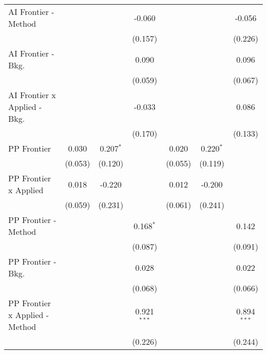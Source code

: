 \begin{tabular}{lcccccc}
   AI Frontier - Method           &         &               & -0.060         &              &                & -0.056\\   
                                  &         &               & (0.157)        &              &                & (0.226)\\   
   AI Frontier - Bkg.             &         &               & 0.090          &              &                & 0.096\\   
                                  &         &               & (0.059)        &              &                & (0.067)\\   
   AI Frontier x Applied - Bkg.   &         &               & -0.033         &              &                & 0.086\\   
                                  &         &               & (0.170)        &              &                & (0.133)\\   
   PP Frontier                    & 0.030   & 0.207$^{*}$   &                & 0.020        & 0.220$^{*}$    &   \\   
                                  & (0.053) & (0.120)       &                & (0.055)      & (0.119)        &   \\   
   PP Frontier x Applied          & 0.018   & -0.220        &                & 0.012        & -0.200         &   \\   
                                  & (0.059) & (0.231)       &                & (0.061)      & (0.241)        &   \\   
   PP Frontier - Method           &         &               & 0.168$^{*}$    &              &                & 0.142\\   
                                  &         &               & (0.087)        &              &                & (0.091)\\   
   PP Frontier - Bkg.             &         &               & 0.028          &              &                & 0.022\\   
                                  &         &               & (0.068)        &              &                & (0.066)\\   
   PP Frontier x Applied - Method &         &               & 0.921$^{***}$  &              &                & 0.894$^{***}$\\   
                                  &         &               & (0.226)        &              &                & (0.244)\\   

\end{tabular}
